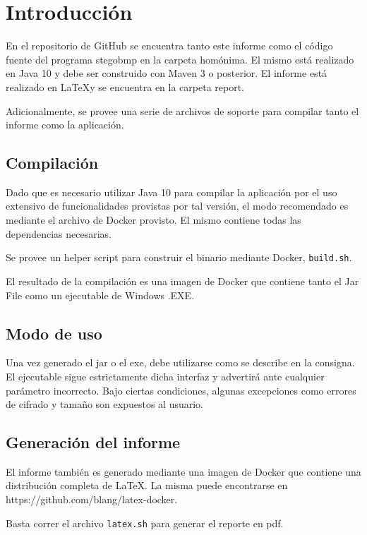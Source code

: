 \section{Introducci\'on} \label{intro}
En el repositorio de GitHub se encuentra tanto este informe como el código fuente del programa stegobmp en la carpeta homónima. El mismo está realizado en Java 10 y debe ser construido con Maven 3 o posterior. El informe está realizado en \LaTeX y se encuentra en la carpeta report.

Adicionalmente, se provee una serie de archivos de soporte para compilar tanto el informe como la aplicación.

\subsection{Compilación}

Dado que es necesario utilizar Java 10 para compilar la aplicación por el uso extensivo de funcionalidades provistas por tal versión, el modo recomendado es mediante el archivo de Docker provisto. El mismo contiene todas las dependencias necesarias.

Se provee un helper script para construir el binario mediante Docker, \texttt{build.sh}.

El resultado de la compilaci\'on es una imagen de Docker que contiene tanto el Jar File como un ejecutable de Windows .EXE.

\subsection{Modo de uso}

Una vez generado el jar o el exe, debe utilizarse como se describe en la consigna. El ejecutable sigue estrictamente dicha interfaz y advertir\'a ante cualquier par\'ametro incorrecto. Bajo ciertas condiciones, algunas excepciones como errores de cifrado y tama\~no son expuestos al usuario.

\subsection{Generación del informe}

El informe tambi\'en es generado mediante una imagen de Docker que contiene una distribuci\'on completa de \LaTeX. La misma puede encontrarse en https://github.com/blang/latex-docker.

Basta correr el archivo \texttt{latex.sh} para generar el reporte en pdf.